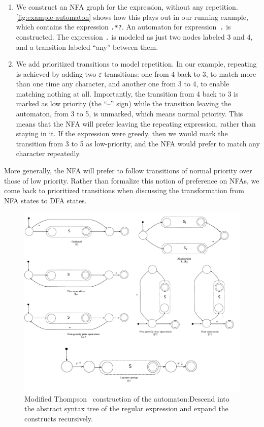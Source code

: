 \documentclass[english]{sigplanconf}
\theoremstyle{definition}
\begin{document}
\begin{enumerate}
\item We construct an NFA graph for the expression, without any
repetition.  \autoref{fig:example-automaton} shows how this plays
out in our running example, which contains the expression \texttt{.*?}.
An automaton for expression~\texttt{.} is constructed. The expression
\texttt{.} is modeled as just two nodes labeled 3 and 4, and a
transition labeled ``any'' between them.

\item We add prioritized transitions to model repetition. In our
example, repeating is achieved by adding two $\varepsilon$ transitions:
one from 4 back to 3, to match more than one time any character,
and another one from 3 to 4, to enable matching nothing at all.
Importantly, the transition from 4 back to 3 is marked as low
priority (the ``--'' sign) while the transition leaving the automaton,
from 3 to 5, is unmarked, which means normal priority.  This means
that the NFA will prefer leaving the repeating expression, rather
than staying in it.  If the expression were greedy, then we would
mark the transition from 3 to 5 as low-priority, and the NFA would
prefer to match any character repeatedly.

\end{enumerate}

More generally, the NFA will prefer to follow transitions of normal
priority over those of low priority. Rather than formalize this
notion of preference on NFAs, we come back to prioritized transitions when
discussing the transformation from NFA states to DFA states.

\begin{figure}[tb] \includegraphics[width=\linewidth]{graphs/thompson}
\caption{Modified Thompson~\cite{Thom68a} construction of the
automaton:Descend into the abstract syntax tree of the regular
expression and expand the constructs recursively.}
\label{fig:thompson-construction} 
\end{figure}
\end{document}
